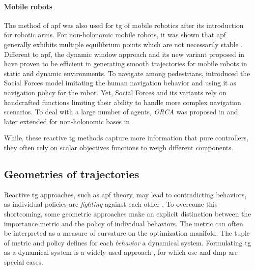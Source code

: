 \paragraph{Mobile robots}

The method of \ac{apf} was also used for \ac{tg} of mobile
robotics after its introduction for robotic arms.
For non-holonomic mobile robots, it was shown that \ac{apf}
generally exhibits multiple equilibrium points which are not
necessarily stable \cite{urakubo2018stability}.
Different to \ac{apf}, the dynamic window approach
\cite{Fox1997} and its new variant proposed in
\cite{Zhang2019} have proven to be efficient in generating
smooth trajectories for mobile robots in static and dynamic
environments. To navigate among pedestrians,
\cite{Ferrer2013} introduced the Social Forces model
imitating the human navigation behavior and using it as
navigation policy for the robot.  Yet, Social Forces and its
variants rely on handcrafted functions limiting their
ability to handle more complex navigation scenarios. To deal
with a large number of agents, \textit{ORCA} was proposed in
\cite{VanDenBerg2011} and later extended for non-holonomic
bases in \cite{Alonso-Mora2012a}.


While, these reactive \ac{tg} methods capture more
information that pure controllers, they often rely on 
scalar objectives functions to weigh different components.

\subsection{Geometries of trajectories}
\label{sec:geometries_of_trajectories}

Reactive \ac{tg} approaches, such as \ac{apf} theory,
may lead to contradicting behaviors, as individual policies
are \textit{fighting} against each other \cite{Ratliff2018}.
To overcome this shortcoming, some geometric approaches make
an explicit distinction between the importance metric and
the policy of individual behaviors. The metric can often be
interpreted as a measure of curvature on the optimization
manifold. The tuple of metric and policy defines
for each \textit{behavior} a dynamical system.
Formulating \ac{tg} as a dynamical system is a widely used
approach
\cite{khansari2012dynamical,huber2023avoidance}, for which
\ac{osc} \cite{Khatib1987a} and \ac{dmp}
\cite{ijspeert2013dynamical} are special cases.
%


